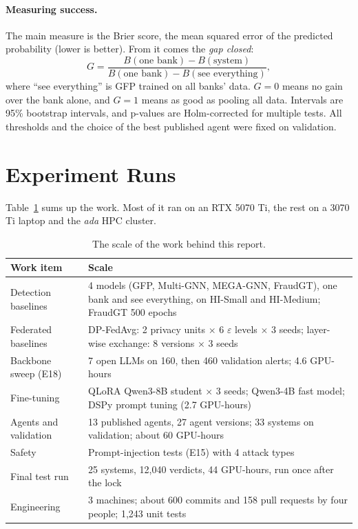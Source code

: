 \documentclass[11pt,a4paper]{article}
\begin{document}
\paragraph{Measuring success.} The main measure is the Brier score, the mean squared error of the predicted probability (lower is better). From it comes the \emph{gap closed}:
\[
G = \frac{B(\text{one bank}) - B(\text{system})}{B(\text{one bank}) - B(\text{see everything})},
\]
where ``see everything'' is GFP trained on all banks' data. $G=0$ means no gain over the bank alone, and $G=1$ means as good as pooling all data. Intervals are 95\% bootstrap intervals, and p-values are Holm-corrected for multiple tests. All thresholds and the choice of the best published agent were fixed on validation.

\section{Experiment Runs}
\label{sec:exp}

Table~\ref{tab:scale} sums up the work. Most of it ran on an RTX 5070 Ti, the rest on a 3070 Ti laptop and the \emph{ada} HPC cluster.

\begin{table}[!htb]
\centering\small
\begin{tabularx}{\linewidth}{lX}
\toprule
Work item & Scale \\
\midrule
Detection baselines & 4 models (GFP, Multi-GNN, MEGA-GNN, FraudGT), one bank and see everything, on HI-Small and HI-Medium; FraudGT 500 epochs \\
Federated baselines & DP-FedAvg: 2 privacy units $\times$ 6 $\varepsilon$ levels $\times$ 3 seeds; layer-wise exchange: 8 versions $\times$ 3 seeds \\
Backbone sweep (E18) & 7 open LLMs on 160, then 460 validation alerts; 4.6 GPU-hours \\
Fine-tuning & QLoRA Qwen3-8B student $\times$ 3 seeds; Qwen3-4B fast model; DSPy prompt tuning (2.7 GPU-hours) \\
Agents and validation & 13 published agents, 27 agent versions; 33 systems on validation; about 60 GPU-hours \\
Safety & Prompt-injection tests (E15) with 4 attack types \\
Final test run & 25 systems, 12,040 verdicts, 44 GPU-hours, run once after the lock \\
Engineering & 3 machines; about 600 commits and 158 pull requests by four people; 1,243 unit tests \\
\bottomrule
\end{tabularx}
\caption{The scale of the work behind this report.}
\label{tab:scale}
\end{table}
\end{document}
